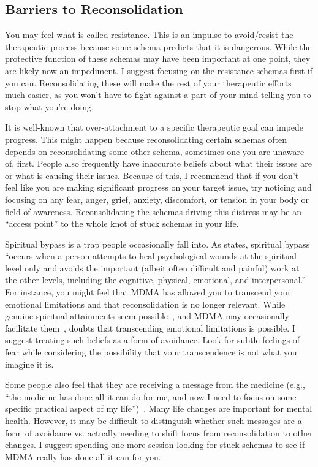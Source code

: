 \documentclass[11pt,oneside]{book}
\let\cite\parencite
\begin{document}
\subsection*{Barriers to Reconsolidation}
You may feel what is called resistance. This is an impulse to avoid/resist the therapeutic process because some schema predicts that it is dangerous. While the protective function of these schemas may have been important at one point, they are likely now an impediment. I suggest focusing on the resistance schemas first if you can. Reconsolidating these will make the rest of your therapeutic efforts much easier, as you won't have to fight against a part of your mind telling you to stop what you're doing.

It is well-known that over-attachment to a specific therapeutic goal can impede progress. This might happen because reconsolidating certain schemas often depends on reconsolidating some other schema, sometimes one you are unaware of, first. People also frequently have inaccurate beliefs about what their issues are or what is causing their issues. Because of this, I recommend that if you don't feel like you are making significant progress on your target issue, try noticing and focusing on any fear, anger, grief, anxiety, discomfort, or tension in your body or field of awareness. Reconsolidating the schemas driving this distress may be an \enquote{access point} to the whole knot of stuck schemas in your life.

Spiritual bypass is a trap people occasionally fall into. As \textcite[sec. Spirituality and spiritual bypass defined]{cashwell2007Bypass} states, spiritual bypass \enquote{occurs when a person attempts to heal psychological wounds at the spiritual level only and avoids the important (albeit often difficult and painful) work at the other levels, including the cognitive, physical, emotional, and interpersonal.} For instance, you might feel that MDMA has allowed you to transcend your emotional limitations and that reconsolidation is no longer relevant. While genuine spiritual attainments seem possible~\cite{ingram2018mastering}, and MDMA may occasionally facilitate them~\cite{ingramMDMA}, \textcite{ingram2018mastering} doubts that transcending emotional limitations is possible. I suggest treating such beliefs as a form of avoidance. Look for subtle feelings of fear while considering the possibility that your transcendence is not what you imagine it is.

Some people also feel that they are receiving a message from the medicine (e.g., \enquote{the medicine has done all it can do for me, and now I need to focus on some specific practical aspect of my life})~\cite{razviDissociation}. Many life changes are important for mental health. However, it may be difficult to distinguish whether such messages are a form of avoidance vs. actually needing to shift focus from reconsolidation to other changes. I suggest spending one more session looking for stuck schemas to see if MDMA really has done all it can for you.
\end{document}
